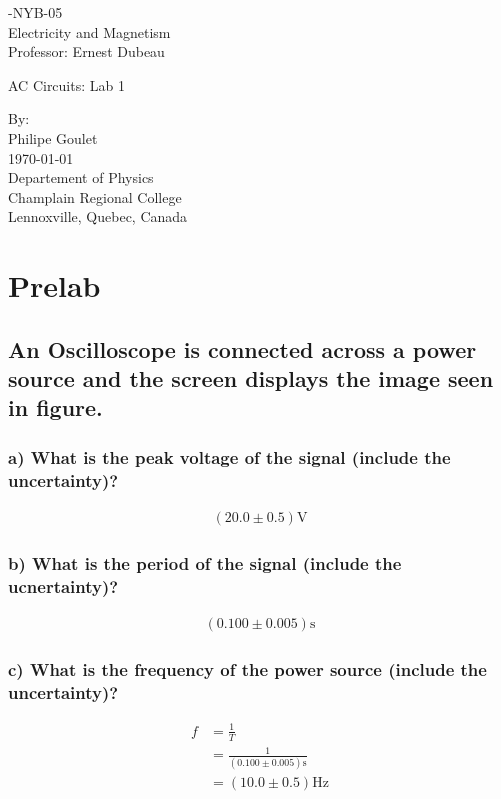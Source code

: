 \documentclass{report}
\begin{document}
\begin{titlepage}
    -NYB-05\\
    Electricity and Magnetism\\
    Professor: Ernest Dubeau\par
    \vspace{5cm}
    \Large AC Circuits: Lab 1\par
    \normalsize
    By:\\
    Philipe Goulet\\
    \vspace*{\fill}
    {\today}\\
    Departement of Physics\\
    Champlain Regional College\\
    Lennoxville, Quebec, Canada
\end{titlepage}
\chapter{Prelab}

\section{An Oscilloscope is connected across a power source and the screen displays the image seen in figure. }

\subsection*{a) What is the peak voltage of the signal (include the uncertainty)?}
    \begin{gather}
        (20.0\pm0.5)\si{\volt}
    \end{gather}

\subsection*{b) What is the period of the signal (include the ucnertainty)?}
    \begin{gather}
        (0.100\pm0.005)\si{\second}
    \end{gather}

\subsection*{c) What is the frequency of the power source (include the uncertainty)?}
    \begin{align}
        f&=\frac{1}{T}\nonumber\\
         &=\frac{1}{(0.100\pm0.005)\si{\second}}\nonumber\\
         &=(10.0\pm0.5)\si{\hertz}
    \end{align}
\end{document}
